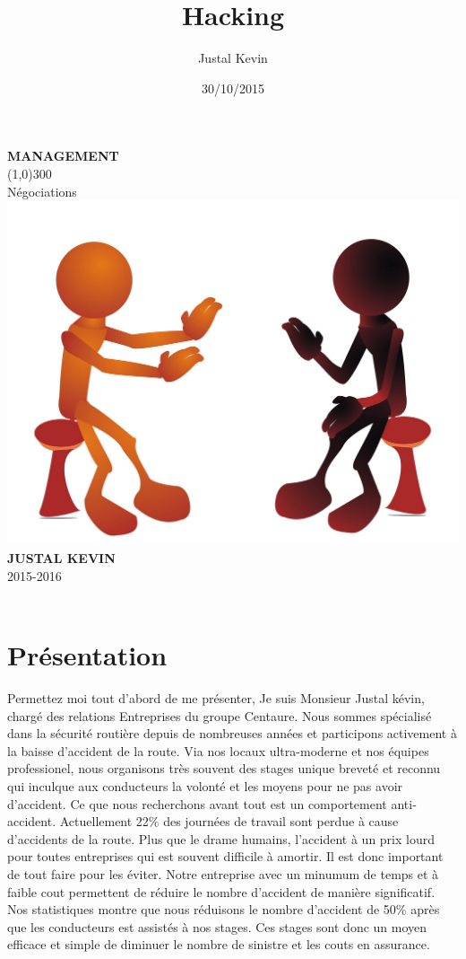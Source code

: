 \documentclass{article}
\title{Hacking}
\author{Justal Kevin}
\date{30/10/2015}
\begin{document}
\begin{center}
\textbf{\Huge{MANAGEMENT}}\\
\line(1,0){300}\\
Négociations\\
\vspace{3cm}
\includegraphics[width=\textwidth]{1}\\
\vspace{3cm}
\textbf{JUSTAL KEVIN}\\
2015-2016\\
\vspace{3cm}
\textbf{}\\
\end{center}

\newpage
\tableofcontents

\newpage
\section{Présentation}
\hspace*{0.6cm}Permettez moi tout d'abord de me présenter, Je suis Monsieur Justal kévin, chargé des relations Entreprises du groupe Centaure. Nous sommes spécialisé dans la sécurité routière depuis de nombreuses années et participons activement à la baisse d'accident de la route. Via nos locaux ultra-moderne et nos équipes professionel, nous organisons très souvent des stages unique breveté et reconnu qui inculque aux conducteurs la volonté et les moyens pour ne pas avoir d'accident. Ce que nous recherchons avant tout est un comportement anti-accident. Actuellement 22\% des journées de travail sont perdue à cause d'accidents de la route. Plus que le drame humains, l'accident à un prix lourd pour toutes entreprises qui est souvent difficile à amortir. Il est donc important de tout faire pour les éviter. Notre entreprise avec un minumum de temps et à faible cout permettent de réduire le nombre d'accident de manière significatif. Nos statistiques montre que nous réduisons le nombre d'accident de 50\% après que les conducteurs est assistés à nos stages. Ces stages sont donc un moyen efficace et simple de diminuer le nombre de sinistre et les couts en assurance.
\vspace{0.2cm}\\
\end{document}
